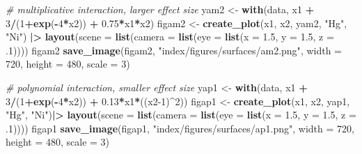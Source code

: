 \documentclass[12pt, twoside]{amherstthesis}
\newenvironment{Shaded}{\begin{snugshade}}{\end{snugshade}}
\newcommand{\AttributeTok}[1]{\textcolor[rgb]{0.13,0.29,0.53}{#1}}
\newcommand{\CommentTok}[1]{\textcolor[rgb]{0.56,0.35,0.01}{\textit{#1}}}
\newcommand{\DecValTok}[1]{\textcolor[rgb]{0.00,0.00,0.81}{#1}}
\newcommand{\FloatTok}[1]{\textcolor[rgb]{0.00,0.00,0.81}{#1}}
\newcommand{\FunctionTok}[1]{\textcolor[rgb]{0.13,0.29,0.53}{\textbf{#1}}}
\newcommand{\NormalTok}[1]{#1}
\newcommand{\OtherTok}[1]{\textcolor[rgb]{0.56,0.35,0.01}{#1}}
\newcommand{\SpecialCharTok}[1]{\textcolor[rgb]{0.81,0.36,0.00}{\textbf{#1}}}
\newcommand{\StringTok}[1]{\textcolor[rgb]{0.31,0.60,0.02}{#1}}
\begin{document}
\begin{Shaded}
\begin{Highlighting}[]
\CommentTok{\# multiplicative interaction, larger effect size}
\NormalTok{yam2 }\OtherTok{\textless{}{-}} \FunctionTok{with}\NormalTok{(data, x1 }\SpecialCharTok{+} \DecValTok{3}\SpecialCharTok{/}\NormalTok{(}\DecValTok{1}\SpecialCharTok{+}\FunctionTok{exp}\NormalTok{(}\SpecialCharTok{{-}}\DecValTok{4}\SpecialCharTok{*}\NormalTok{x2)) }\SpecialCharTok{+} \FloatTok{0.75}\SpecialCharTok{*}\NormalTok{x1}\SpecialCharTok{*}\NormalTok{x2) }
\NormalTok{figam2 }\OtherTok{\textless{}{-}} \FunctionTok{create\_plot}\NormalTok{(x1, x2, yam2, }\StringTok{"Hg"}\NormalTok{, }\StringTok{"Ni"}\NormalTok{) }\SpecialCharTok{|\textgreater{}} 
  \FunctionTok{layout}\NormalTok{(}\AttributeTok{scene =} \FunctionTok{list}\NormalTok{(}\AttributeTok{camera =} \FunctionTok{list}\NormalTok{(}\AttributeTok{eye =} \FunctionTok{list}\NormalTok{(}\AttributeTok{x =} \FloatTok{1.5}\NormalTok{, }\AttributeTok{y =} \FloatTok{1.5}\NormalTok{, }\AttributeTok{z =}\NormalTok{ .}\DecValTok{1}\NormalTok{))))}
\NormalTok{figam2}
\FunctionTok{save\_image}\NormalTok{(figam2, }\StringTok{"index/figures/surfaces/am2.png"}\NormalTok{, }
           \AttributeTok{width =} \DecValTok{720}\NormalTok{, }\AttributeTok{height =} \DecValTok{480}\NormalTok{, }\AttributeTok{scale =} \DecValTok{3}\NormalTok{)}

\CommentTok{\# polynomial interaction, smaller effect size}
\NormalTok{yap1 }\OtherTok{\textless{}{-}} \FunctionTok{with}\NormalTok{(data, x1 }\SpecialCharTok{+} \DecValTok{3}\SpecialCharTok{/}\NormalTok{(}\DecValTok{1}\SpecialCharTok{+}\FunctionTok{exp}\NormalTok{(}\SpecialCharTok{{-}}\DecValTok{4}\SpecialCharTok{*}\NormalTok{x2)) }\SpecialCharTok{+} \FloatTok{0.13}\SpecialCharTok{*}\NormalTok{x1}\SpecialCharTok{*}\NormalTok{((x2}\DecValTok{{-}1}\NormalTok{)}\SpecialCharTok{\^{}}\DecValTok{2}\NormalTok{))}
\NormalTok{figap1 }\OtherTok{\textless{}{-}} \FunctionTok{create\_plot}\NormalTok{(x1, x2, yap1, }\StringTok{"Hg"}\NormalTok{, }\StringTok{"Ni"}\NormalTok{)}\SpecialCharTok{|\textgreater{}} 
  \FunctionTok{layout}\NormalTok{(}\AttributeTok{scene =} \FunctionTok{list}\NormalTok{(}\AttributeTok{camera =} \FunctionTok{list}\NormalTok{(}\AttributeTok{eye =} \FunctionTok{list}\NormalTok{(}\AttributeTok{x =} \FloatTok{1.5}\NormalTok{, }\AttributeTok{y =} \FloatTok{1.5}\NormalTok{, }\AttributeTok{z =}\NormalTok{ .}\DecValTok{1}\NormalTok{))))}
\NormalTok{figap1}
\FunctionTok{save\_image}\NormalTok{(figap1, }\StringTok{"index/figures/surfaces/ap1.png"}\NormalTok{, }
           \AttributeTok{width =} \DecValTok{720}\NormalTok{, }\AttributeTok{height =} \DecValTok{480}\NormalTok{, }\AttributeTok{scale =} \DecValTok{3}\NormalTok{)}


\end{Highlighting}
\end{Shaded}
\end{document}
